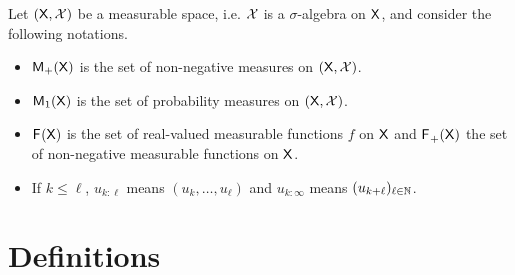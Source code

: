 \documentclass[english,graybox,envcountchap,envcountsame,sectrefs,shortlabels]{svmono}
\theoremstyle{style}
\begin{document}
Let $(\mathsf{X},\mathcal{X})$ be a measurable space, i.e.  $\mathcal{X}$ is a $\sigma$-algebra on $\mathsf{X}$, and consider the following notations.
\begin{itemize}
\item $\mathsf{M}_{+}(\mathsf{X})$ is the set of non-negative measures on $(\mathsf{X},\mathcal{X})$.
\item $\mathsf{M}_{1}(\mathsf{X})$ is the set of probability measures on $(\mathsf{X},\mathcal{X})$.
\item $\mathsf{F_{}}(\mathsf{X})$ is the set of real-valued measurable functions
$f$ on $\mathsf{X}$ and $\mathsf{F_{}}_{+}(\mathsf{X})$ the set of non-negative measurable
functions on $\mathsf{X}$.
\item If $k\leq\ell$,  $u_{k:\ell}$ means $(u_{k},\ldots,u_{\ell})$ and $u_{k:\infty}$ means $(u_{k+\ell})_{\ell\in\mathbb{N}}$.
\end{itemize}

\section{Definitions}
\end{document}
